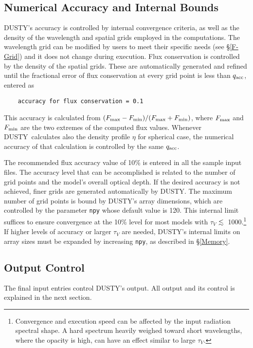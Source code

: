 \documentclass[11pt]{article}
\def\D    {{\sf DUSTY}}
\def\la    {\hbox{$\mathrel{\hbox{\raise.3ex\hbox{$<$}\llap
                                {\lower.8ex\hbox{$\sim$}}}}$}}
\def\tV     {\hbox{$\tau_V$}}
\begin{document}
\subsection{Numerical Accuracy and Internal Bounds}
\label{numerics}

\D's accuracy is controlled by internal convergence criteria, as well
as the density of the wavelength and spatial grids employed in the
computations. The wavelength grid can be modified by users to meet
their specific needs (see \S\ref{F-Grid}) and it does not change
during execution. Flux conservation is controlled by the density of
the spatial grids. These are automatically generated and refined until
the fractional error of flux conservation at every grid point is less
than $q_{\rm acc}$, entered as
%
\begin{verbatim}
    accuracy for flux conservation = 0.1
\end{verbatim}
This accuracy is calculated from $(F_{\rm max} - F_{\rm min})/(F_{\rm
  max} + F_{\rm min})$, where $F_{\rm max}$ and $F_{\rm min}$ are the
two extremes of the computed flux values. Whenever \D\ calculates also
the density profile $\eta$ for spherical case, the numerical accuracy
of that calculation is controlled by the same $q_{\rm acc}$.

The recommended flux accuracy value of 10\% is entered in all the
sample input files. The accuracy level that can be accomplished is
related to the number of grid points and the model's overall optical
depth. If the desired accuracy is not achieved, finer grids are
generated automatically by \D. The maximum number of grid points is
bound by \D's array dimensions, which are controlled by the parameter
{\tt npy} whose default value is 120. This internal limit suffices to
ensure convergence at the 10\% level for most models with $\tau_V$
\la\ 1000.\footnote{Convergence and execution speed can be affected by
  the input radiation spectral shape. A hard spectrum heavily weighed
  toward short wavelengths, where the opacity is high, can have an
  effect similar to large \tV.} If higher levels of accuracy or larger
$\tau_V$ are needed, \D's internal limits on array sizes must be
expanded by increasing {\tt npy}, as described in \S\ref{Memory}.

\subsection{Output Control}

The final input entries control \D's output. All output and its
control is explained in the next section.
\end{document}
